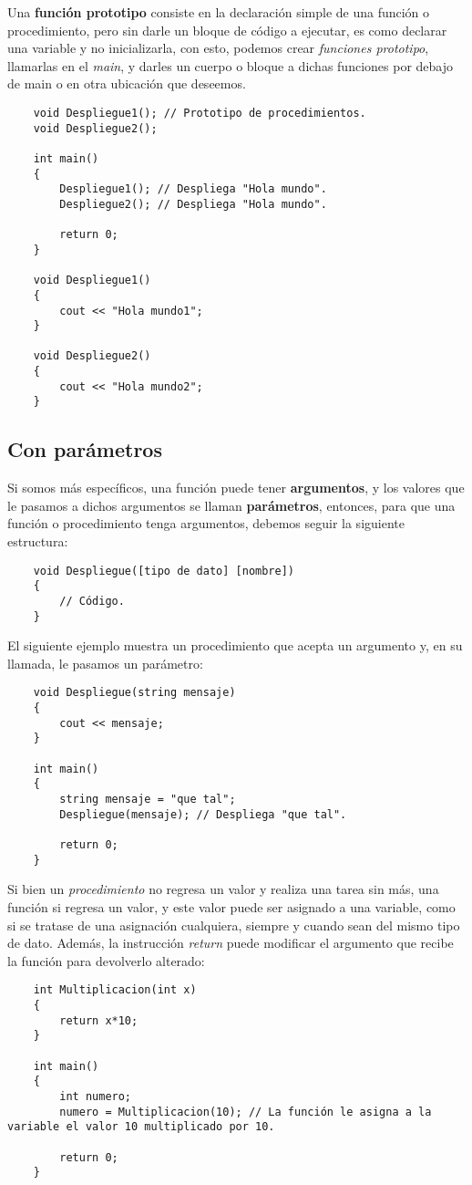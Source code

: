 Una \textbf{función prototipo} consiste en la declaración simple de una función o procedimiento, pero sin darle un bloque de código a ejecutar, es como declarar una variable y no inicializarla, con esto, podemos crear \textit{funciones prototipo}, llamarlas en el \textit{main}, y darles un cuerpo o bloque a dichas funciones por debajo de main o en otra ubicación que deseemos.
\begin{lstlisting}
    void Despliegue1(); // Prototipo de procedimientos.
    void Despliegue2();
    
    int main()
    {
        Despliegue1(); // Despliega "Hola mundo".
        Despliegue2(); // Despliega "Hola mundo".
        
        return 0;
    }
    
    void Despliegue1()
    {
        cout << "Hola mundo1";
    }
    
    void Despliegue2()
    {
        cout << "Hola mundo2";
    }
\end{lstlisting}


\subsection{Con parámetros}

Si somos más específicos, una función puede tener \textbf{argumentos}, y los valores que le pasamos a dichos argumentos se llaman \textbf{parámetros}, entonces, para que una función o procedimiento tenga argumentos, debemos seguir la siguiente estructura:
\begin{lstlisting}
    void Despliegue([tipo de dato] [nombre])
    {
        // Código.
    }
\end{lstlisting}

El siguiente ejemplo muestra un procedimiento que acepta un argumento y, en su llamada, le pasamos un parámetro:
\begin{lstlisting}
    void Despliegue(string mensaje)
    {
        cout << mensaje;
    }
    
    int main()
    {
        string mensaje = "que tal";
        Despliegue(mensaje); // Despliega "que tal".
        
        return 0;
    }
\end{lstlisting}

Si bien un \textit{procedimiento} no regresa un valor y realiza una tarea sin más, una función si regresa un valor, y este valor puede ser asignado a una variable, como si se tratase de una asignación cualquiera, siempre y cuando sean del mismo tipo de dato. Además, la instrucción \textit{return} puede modificar el argumento que recibe la función para devolverlo alterado:
\begin{lstlisting}
    int Multiplicacion(int x)
    {
        return x*10;
    }
    
    int main()
    {
        int numero;
        numero = Multiplicacion(10); // La función le asigna a la variable el valor 10 multiplicado por 10.
        
        return 0;
    }
\end{lstlisting}


